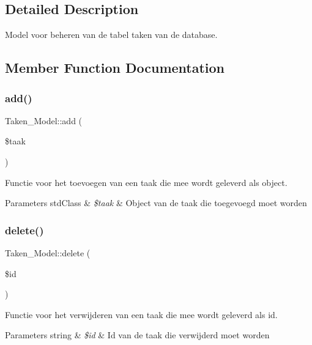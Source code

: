 \subsection{Detailed Description}
Model voor beheren van de tabel taken van de database. 

\subsection{Member Function Documentation}
\mbox{\label{class_taken___model_a4ef6e4ab1c71556c29cdc6549e8c888b}} 
\subsubsection{\texorpdfstring{add()}{add()}}
{\footnotesize\ttfamily Taken\+\_\+\+Model\+::add (\begin{DoxyParamCaption}\item[{}]{\$taak }\end{DoxyParamCaption})}

Functie voor het toevoegen van een taak die mee wordt geleverd als object. 
\begin{DoxyParams}[1]{Parameters}
std\+Class & {\em \$taak} & Object van de taak die toegevoegd moet worden \\
\hline
\end{DoxyParams}
\mbox{\label{class_taken___model_ab00c14e7a0a268dc3f708b45f3bd172b}} 
\subsubsection{\texorpdfstring{delete()}{delete()}}
{\footnotesize\ttfamily Taken\+\_\+\+Model\+::delete (\begin{DoxyParamCaption}\item[{}]{\$id }\end{DoxyParamCaption})}

Functie voor het verwijderen van een taak die mee wordt geleverd als id. 
\begin{DoxyParams}[1]{Parameters}
string & {\em \$id} & Id van de taak die verwijderd moet worden \\
\hline
\end{DoxyParams}
\mbox{\label{class_taken___model_ab8c238bca4fc5170294717b94c875cc3}} 
